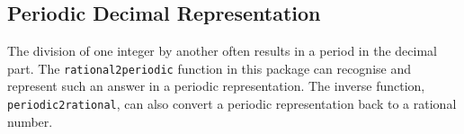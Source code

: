 \subsection{Periodic Decimal Representation}

The division of one integer by another often results in
a period in the decimal part. The \texttt{rational2periodic}
function in this package can recognise and represent
such an answer in a periodic representation. The inverse
function, \texttt{periodic2rational}, can also convert a
periodic representation back to a rational number.

\hypertarget{operator:RATIONAL2PERIODIC}{}
\hypertarget{operator:PERIODIC2RATIONAL}{}
\hypertarget{operator:RATIONAL}{}

